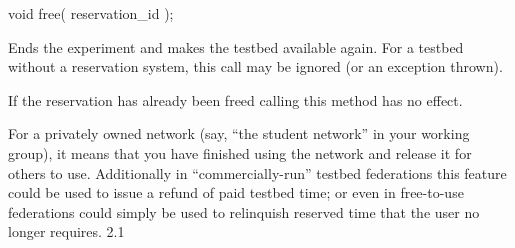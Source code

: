 \begin{apidoc}
	{void free( reservation\_id );} %
	{
		Ends the experiment and makes the testbed available again. For a testbed without a reservation system, this call may be ignored (or an exception thrown).%
		
		If the reservation has already been freed calling this method has no effect.
	} %
	{
	} %
	{} %
	{
	For a privately owned network (say, ``the student network'' in your working group), it means that you have finished using the network and release it for others to use. Additionally in ``commercially-run'' testbed federations this feature could be used to issue a refund of paid testbed time; or even in free-to-use federations could simply be used to relinquish reserved time that the user no longer requires.	
	} %
	{2.1} %
\end{apidoc}


